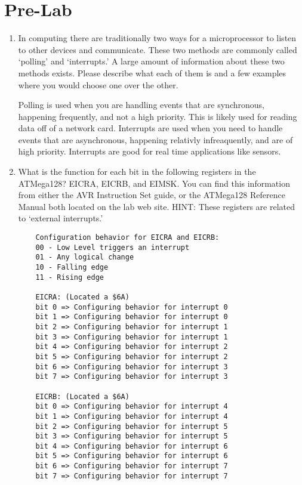\documentclass[12pt]{article}
\def\author{Jacques Uber}
\def\title{Lab5 Pre-Lab Questions}
\def\date{\today}
\begin{document}
\fancyhf{} %
\fancyhead[LO]{\author}
\fancyhead[RO]{\date}
\fancyhead[CO]{\title}



\section{Pre-Lab}
\begin{enumerate}
    \item
    In computing there are traditionally two ways for a microprocessor to listen to other devices and
    communicate. These two methods are commonly called ‘polling’ and ‘interrupts.’ A large amount of
    information about these two methods exists. Please describe what each of them is and a few examples
    where you would choose one over the other.

    Polling is used when you are handling events that are synchronous, happening frequently, and not
    a high priority. This is likely used for reading data off of a network card. Interrupts are used
    when you need to handle events that are asynchronous, happening relativly infreaquently, and are of high
    priority. Interrupts are good for real time applications like sensors.

    \item
    What is the function for each bit in the following registers in the ATMega128? EICRA, EICRB, and
    EIMSK. You can find this information from either the AVR Instruction Set guide, or the ATMega128
    Reference Manual both located on the lab web site.  HINT: These registers are related to ‘external
    interrupts.’

    \begin{verbatim}
    Configuration behavior for EICRA and EICRB:
    00 - Low Level triggers an interrupt
    01 - Any logical change
    10 - Falling edge
    11 - Rising edge

    EICRA: (Located a $6A)
    bit 0 => Configuring behavior for interrupt 0
    bit 1 => Configuring behavior for interrupt 0
    bit 2 => Configuring behavior for interrupt 1
    bit 3 => Configuring behavior for interrupt 1
    bit 4 => Configuring behavior for interrupt 2
    bit 5 => Configuring behavior for interrupt 2
    bit 6 => Configuring behavior for interrupt 3
    bit 7 => Configuring behavior for interrupt 3

    EICRB: (Located a $6A)
    bit 0 => Configuring behavior for interrupt 4
    bit 1 => Configuring behavior for interrupt 4
    bit 2 => Configuring behavior for interrupt 5
    bit 3 => Configuring behavior for interrupt 5
    bit 4 => Configuring behavior for interrupt 6
    bit 5 => Configuring behavior for interrupt 6
    bit 6 => Configuring behavior for interrupt 7
    bit 7 => Configuring behavior for interrupt 7


\end{verbatim}
\end{enumerate}
\end{document}
